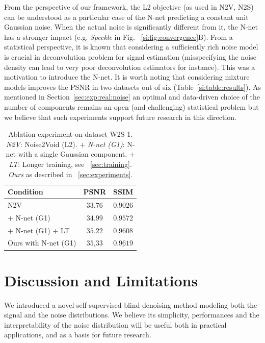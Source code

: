 \documentclass{article}
\begin{document}
From the perspective of our framework, the L2 objective (as used in N2V, N2S) can be understood as a particular case of the N-net predicting a constant unit Gaussian noise. When the actual noise is significantly different from it, the N-net has a stronger impact (e.g. \textit{Speckle} in Fig. ~\ref{si:fig:convergence}B).
From a statistical perspective, it is known that considering a sufficiently rich noise model is crucial in deconvolution problem for signal estimation (misspecifying the noise density can lead to very poor deconvolution estimators for instance). This was a motivation to introduce the N-net.
It is worth noting that considering mixture models improves the PSNR in two datasets out of six (Table~\ref{si:table:results}).
As mentioned in Section~\ref{sec:exp:real:noise} an optimal and data-driven choice of the number of components remains an open (and challenging) statistical problem but we believe that such experiments support future research in this direction.

\begin{table}[ht]
\caption{Ablation experiment on dataset W2S-1.
\textit{N2V}: Noise2Void (L2).
+ \textit{N-net (G1)}: N-net with a single Gaussian component.
+ \textit{LT}: Longer training, see ~\ref{sec:training}.
\textit{Ours} as described in ~\ref{sec:experiments}.
}
\label{table:ablation}
\begin{center}
\begin{small}
\begin{sc}
\begin{tabular}{lcc}
\toprule
Condition & PSNR & SSIM \\
\midrule
N2V & $33.76$ & $0.9026$\\
 + N-net (G1) & $34.99$ & $0.9572$\\
 + N-net (G1) + LT & $35.22$ & $0.9608$\\
Ours with N-net (G1)& $\underline{35.33}$ & $\underline{0.9619}$\\
\bottomrule
\end{tabular}
\end{sc}
\end{small}
\end{center}
\end{table}

\section{Discussion and Limitations}
\label{sec:discussion}
We introduced a novel self-supervised blind-denoising method modeling both the signal and the noise distributions. We believe its simplicity, performances and the interpretability of the noise distribution will be useful both in practical applications, and as a basis for future research.
\end{document}
